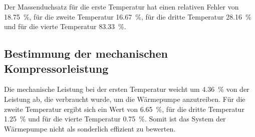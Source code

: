 \noindent Der Massenduchsatz für die erste Temperatur hat einen relativen Fehler von 
\SI{18.75}{\percent}, für die zweite Temperatur \SI{16.67}{\percent}, für die dritte 
Temperatur \SI{28.16}{\percent} und für die vierte Temperatur \SI{83.33}{\percent}. 

\subsection{Bestimmung der mechanischen Kompressorleistung}
Die mechanische Leistung bei der ersten Temperatur weicht um 
\SI{4.36}{\percent} von der Leistung ab, die verbraucht wurde, um die Wärmepumpe 
anzutreiben. Für die zweite Temperatur ergibt sich ein Wert von \SI{6.65}{\percent}, 
für die dritte Temperatur \SI{1.25}{\percent} und für die vierte Temperatur 
\SI{0.75}{\percent}. 
Somit ist das System der Wärmepumpe nicht als sonderlich effizient zu bewerten.
